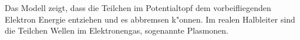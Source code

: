 \begin{refsection}
Das Modell zeigt, dass die Teilchen im Potentialtopf dem vorbeifliegenden
Elektron Energie entziehen und es abbremsen k"onnen.
Im realen Halbleiter sind die Teilchen Wellen im Elektronengas,
sogenannte Plasmonen.


\printbibliography[heading=subbibliography]
\end{refsection}
